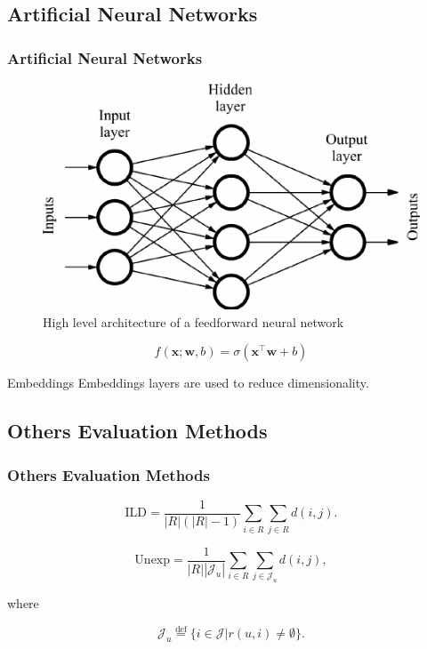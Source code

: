 \documentclass{beamer}
\begin{document}
\subsection{Artificial Neural Networks} 
\begin{frame}
\frametitle{Artificial Neural Networks}

\begin{figure}
	\includegraphics[scale=0.3]{images/FFNN} 
	\caption{High level architecture of a feedforward neural network}
\end{figure}

\begin{equation}
f(\boldsymbol{x} ; \boldsymbol{w}, b)=\sigma(\boldsymbol{x}^{\top} \boldsymbol{w}+b)
\label{eq:nn-one-layer}
\end{equation} 

\begin{block}{Embeddings}
	Embeddings layers are used to reduce dimensionality.
\end{block}

\end{frame}

\subsection{Others Evaluation Methods} 
\begin{frame}
\frametitle{Others Evaluation Methods}

\begin{equation}
\mathrm { ILD } = \frac { 1 } { | R | ( | R | - 1 ) } \sum _ { i \in R } \sum _ { j \in R } d ( i , j ) .
\label{eq:ild}
\end{equation}

\begin{equation}
\mathrm {Unexp} = \frac { 1 } { | R | \left| \mathcal { J } _ { u } \right| } \sum _ { i \in R } \sum _ { j \in \mathcal { J } _ { u } } d ( i , j ) ,
\label{eq:unexp}
\end{equation}


where 

\begin{equation}
\mathcal { J } _ { u } \stackrel { \mathrm { def } } { = } \{ i \in \mathcal { J } | r ( u , i ) \neq \emptyset \} .
\label{eq:unexp-set}
\end{equation}



\end{frame}
\end{document}
